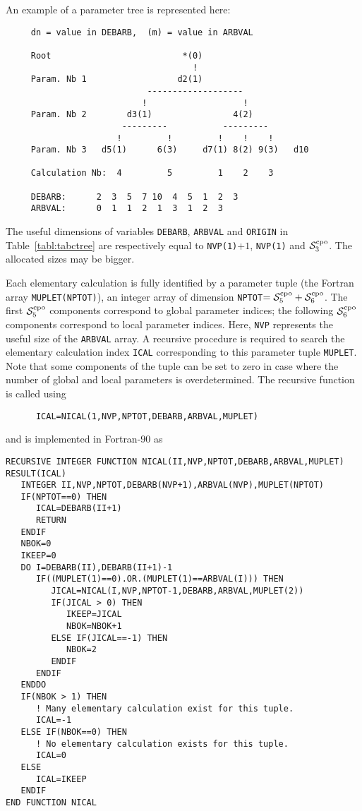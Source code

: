 \vskip 0.2cm

An example of a parameter tree is represented here:
\begin{verbatim}
     dn = value in DEBARB,  (m) = value in ARBVAL

     Root                          *(0)
                                     !
     Param. Nb 1                  d2(1)
                            -------------------
                           !                   !
     Param. Nb 2        d3(1)                4(2)
                       ---------           ---------
                      !         !         !    !    !
     Param. Nb 3   d5(1)      6(3)     d7(1) 8(2) 9(3)   d10

     Calculation Nb:  4         5         1    2    3

     DEBARB:      2  3  5  7 10  4  5  1  2  3
     ARBVAL:      0  1  1  2  1  3  1  2  3
\end{verbatim}

\vskip 0.2cm

The useful dimensions of variables {\tt DEBARB}, {\tt ARBVAL} and {\tt ORIGIN} in
Table~\ref{tabl:tabctree} are respectively equal to {\tt NVP(1)}$+1$, {\tt NVP(1)}
and $\mathcal{S}^{\rm cpo}_{3}$. The allocated sizes may be bigger.

\vskip 0.2cm

Each elementary calculation is fully identified by a parameter tuple (the Fortran array {\tt MUPLET(NPTOT)}), an
integer array of dimension {\tt NPTOT}$=\mathcal{S}^{\rm cpo}_{5}+\mathcal{S}^{\rm cpo}_{6}$. The first
$\mathcal{S}^{\rm cpo}_{5}$ components correspond to global parameter indices; the following
$\mathcal{S}^{\rm cpo}_{6}$ components correspond to local parameter indices. Here, {\tt NVP} represents
the useful size of the {\tt ARBVAL} array. A recursive procedure is required to search the elementary
calculation index {\tt ICAL} corresponding to this parameter tuple {\tt MUPLET}. Note that some components of the tuple
can be set to zero in case where the number of global and local parameters is overdetermined. The recursive function
is called using
\begin{verbatim}
      ICAL=NICAL(1,NVP,NPTOT,DEBARB,ARBVAL,MUPLET)
\end{verbatim}

\noindent and is implemented in Fortran-90 as
\begin{verbatim}
RECURSIVE INTEGER FUNCTION NICAL(II,NVP,NPTOT,DEBARB,ARBVAL,MUPLET) RESULT(ICAL)
   INTEGER II,NVP,NPTOT,DEBARB(NVP+1),ARBVAL(NVP),MUPLET(NPTOT)
   IF(NPTOT==0) THEN
      ICAL=DEBARB(II+1)
      RETURN
   ENDIF
   NBOK=0
   IKEEP=0
   DO I=DEBARB(II),DEBARB(II+1)-1
      IF((MUPLET(1)==0).OR.(MUPLET(1)==ARBVAL(I))) THEN
         JICAL=NICAL(I,NVP,NPTOT-1,DEBARB,ARBVAL,MUPLET(2))
         IF(JICAL > 0) THEN
            IKEEP=JICAL
            NBOK=NBOK+1
         ELSE IF(JICAL==-1) THEN
            NBOK=2
         ENDIF
      ENDIF
   ENDDO
   IF(NBOK > 1) THEN
      ! Many elementary calculation exist for this tuple.
      ICAL=-1
   ELSE IF(NBOK==0) THEN
      ! No elementary calculation exists for this tuple.
      ICAL=0
   ELSE
      ICAL=IKEEP
   ENDIF
END FUNCTION NICAL
\end{verbatim}


